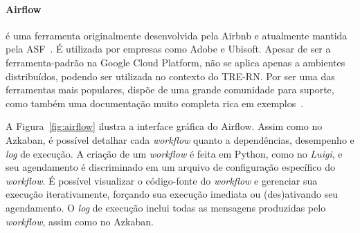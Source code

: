 


\paragraph{Airflow}
é uma ferramenta originalmente desenvolvida pela Airbnb e atualmente mantida pela ASF~\cite{apache}. É utilizada por empresas como Adobe e Ubisoft. Apesar de ser a ferramenta-padrão na Google Cloud Platform, não se aplica apenas a ambientes distribuídos, podendo ser utilizada no contexto do TRE-RN. Por ser uma das ferramentas mais populares, dispõe de uma grande comunidade para suporte, como também uma documentação muito completa rica em exemplos~\cite{airflowdocs}.

A Figura~\ref{fig:airflow} ilustra a interface gráfica do Airflow. Assim como no Azkaban, é possível detalhar cada \textit{workflow} quanto a dependências, desempenho e \textit{log} de execução. A criação de um \textit{workflow} é feita em Python, como no \textit{Luigi}, e seu agendamento é discriminado em um arquivo de configuração específico do \textit{workflow}. É possível visualizar o código-fonte do \textit{workflow} e gerenciar sua execução iterativamente, forçando sua execução imediata ou (des)ativando seu agendamento. O \textit{log} de execução inclui todas as mensagens produzidas pelo \textit{workflow}, assim como no Azkaban.

